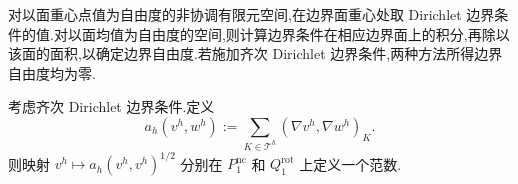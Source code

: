 \begin{note}\label{note:nonconforming-dirichlet}
对以面重心点值为自由度的非协调有限元空间,在边界面重心处取 Dirichlet 边界条件的值.对以面均值为自由度的空间,则计算边界条件在相应边界面上的积分,再除以该面的面积,以确定边界自由度.若施加齐次 Dirichlet 边界条件,两种方法所得边界自由度均为零.
\end{note}

\begin{lemma}\label{lem:nonconforming-energy-norm}
考虑齐次 Dirichlet 边界条件.定义
\[
  a_h(v^h,w^h)
  :=\sum_{K\in\mathcal{T}^h}
       (\nabla v^h,\nabla w^h)_K.
\]
则映射 $v^h\mapsto a_h(v^h,v^h)^{1/2}$ 分别在 $P_1^{\mathrm{nc}}$ 和 $Q_1^{\mathrm{rot}}$ 上定义一个范数.
\end{lemma}

